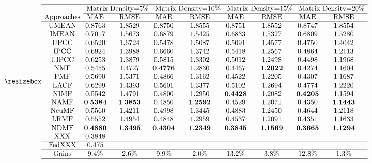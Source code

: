 
\[
    \resizebox {
    \setlength{\arraycolsep}{1pt}
    \begin{array}{ccccccccc}
    \hline & \multicolumn{2}{c}{\text { Matrix Density=5\% }} & \multicolumn{2}{c}{\text { Matrix Density=10\% }} & \multicolumn{2}{c}{\text { Matrix Density=15\% }} & \multicolumn{2}{c}{\text { Matrix Density=20\% }} \\
    \cline { 2 - 9 } \text { Approaches } & \text { MAE } & \text { RMSE } & \text { MAE } & \text { RMSE } & \text { MAE } & \text { RMSE } & \text { MAE } & \text { RMSE } \\
    \hline \text { UMEAN } & 0.8763 & 1.8529 & 0.8750 & 1.8555 & 0.8751 & 1.8552 & 0.8747 & 1.8554 \\
    \text { IMEAN } & 0.7017 & 1.5673 & 0.6879 & 1.5425 & 0.6833 & 1.5327 & 0.6809 & 1.5280 \\
    \text { UPCC } & 0.6520 & 1.6724 & 0.5478 & 1.5087 & 0.5091 & 1.4577 & 0.4750 & 1.4042 \\
    \text { IPCC } & 0.6924 & 1.3988 & 0.6660 & 1.3742 & 0.5418 & 1.2567 & 0.4864 & 1.2113 \\
    \text { UIPCC } & 0.6253 & 1.3879 & 0.5815 & 1.3302 & 0.5012 & 1.2498 & 0.4498 & 1.1968 \\
    \text { NMF } & 0.5455 & 1.4727 & \mathbf{0 . 4 7 7 6} & 1.2830 & 0.4467 & \mathbf{1 . 2 0 2 2} & 0.4274 & 1.1604 \\
    \text { PMF } & 0.5690 & 1.5371 & 0.4866 & 1.3162 & 0.4522 & 1.2205 & 0.4307 & 1.1687 \\
    \text { LACF } & 0.6299 & 1.4393 & 0.5601 & 1.3377 & 0.5102 & 1.2694 & 0.4774 & 1.2220 \\
    \text { NIMF } & 0.5542 & 1.4791 & 0.4800 & 1.2950 & \mathbf{0 . 4 4 2 8} & 1.2082 & \mathbf{0 . 4 2 0 5} & 1.1594 \\
    \text { NAMF } & \mathbf{0 . 5 3 8 4} & \mathbf{1 . 3 8 5 3} & 0.4850 & \mathbf{1 . 2 5 9 2} & 0.4529 & 1.2071 & 0.4350 & \mathbf{1 . 1 4 4 3} \\
    \text { NeuMF } & 0.5560 & 1.4211 & 0.4998 & 1.3445 & 0.4883 & 1.2450 & 0.4644 & 1.2118 \\
    \text { LRMF } & 0.5552 & 1.4954 & 0.4848 & 1.2959 & 0.4537 & 1.2091 & 0.4351 & 1.1633 \\
    \text { NDMF } & \mathbf{0 . 4 8 8 0} & \mathbf{1 . 3 4 9 5} & \mathbf{0 . 4 3 0 4} & \mathbf{1 . 2 3 4 9} & \mathbf{0 . 3 8 4 5} & \mathbf{1 . 1 5 6 9} & \mathbf{0 . 3 6 6 5} & \mathbf{1 . 1 2 9 4} \\
    \text {XXX} & 0.3848 \\
    \hline \text { FedXXX } &0.475 \\
    \hline \text { Gains } & 9.4 \% & 2.6 \% & 9.9 \% & 2.0 \% & 13.2 \% & 3.8 \% & 12.8 \% & 1.3 \% \\
    \hline
    \end{array}
    
    }
    \]
